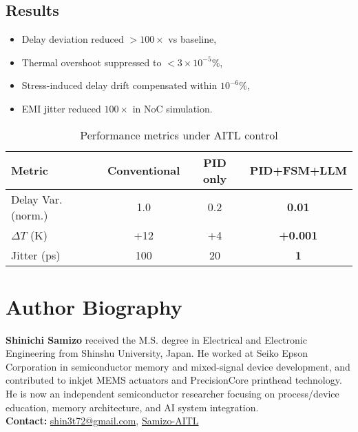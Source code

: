 \documentclass[conference]{IEEEtran}
\begin{document}
\subsection{Results}
\begin{itemize}
  \item Delay deviation reduced $>100\times$ vs baseline,
  \item Thermal overshoot suppressed to $<3\times 10^{-5}\%$,
  \item Stress-induced delay drift compensated within $10^{-6}\%$,
  \item EMI jitter reduced $100\times$ in NoC simulation.
\end{itemize}

\begin{table}[t]
\centering
\caption{Performance metrics under AITL control}
\label{tab:perf}
\begin{tabular}{lccc}
\hline
Metric & Conventional & PID only & PID+FSM+LLM \\
\hline
Delay Var. (norm.) & 1.0 & 0.2 & \textbf{0.01} \\
$\Delta T$ (K)     & +12 & +4  & \textbf{+0.001} \\
Jitter (ps)        & 100 & 20  & \textbf{1} \\
\hline
\end{tabular}
\end{table}




\section*{Author Biography}
\noindent\textbf{Shinichi Samizo}
received the M.S. degree in Electrical and Electronic Engineering from Shinshu University, Japan.
He worked at Seiko Epson Corporation in semiconductor memory and mixed-signal device development, and contributed to inkjet MEMS actuators and PrecisionCore printhead technology.
He is now an independent semiconductor researcher focusing on process/device education, memory architecture, and AI system integration.\\[2pt]
\textbf{Contact:} \href{mailto:shin3t72@gmail.com}{shin3t72@gmail.com},
\href{https://github.com/Samizo-AITL}{Samizo-AITL}

\end{document}
